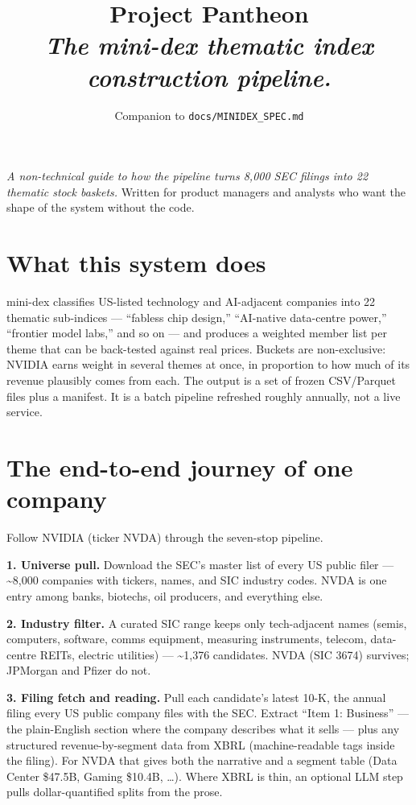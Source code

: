 \documentclass[11pt,a4paper,oneside]{article}
\title{\vspace{-1.2cm}\textbf{Project Pantheon}\\[0.35em]
       {\large\normalfont\itshape The mini-dex thematic index construction pipeline.}}
\date{\small Companion to \texttt{docs/MINIDEX\_SPEC.md}}
\author{}
\begin{document}
\maketitle
\vspace{-1.5em}

\noindent\emph{A non-technical guide to how the pipeline turns 8,000 SEC filings into 22 thematic stock baskets.} Written for product managers and analysts who want the shape of the system without the code.

\vspace{0.5em}

\tableofcontents

\vspace{1em}

\section{What this system does}

mini-dex classifies US-listed technology and AI-adjacent companies into 22 thematic sub-indices --- ``fabless chip design,'' ``AI-native data-centre power,'' ``frontier model labs,'' and so on --- and produces a weighted member list per theme that can be back-tested against real prices. Buckets are non-exclusive: NVIDIA earns weight in several themes at once, in proportion to how much of its revenue plausibly comes from each. The output is a set of frozen CSV/Parquet files plus a manifest. It is a batch pipeline refreshed roughly annually, not a live service.

\section{The end-to-end journey of one company}

Follow NVIDIA (ticker NVDA) through the seven-stop pipeline.

\textbf{1. Universe pull.} Download the SEC's master list of every US public filer --- \textasciitilde 8,000 companies with tickers, names, and SIC industry codes. NVDA is one entry among banks, biotechs, oil producers, and everything else.

\textbf{2. Industry filter.} A curated SIC range keeps only tech-adjacent names (semis, computers, software, comms equipment, measuring instruments, telecom, data-centre REITs, electric utilities) --- \textasciitilde 1,376 candidates. NVDA (SIC 3674) survives; JPMorgan and Pfizer do not.

\textbf{3. Filing fetch and reading.} Pull each candidate's latest 10-K, the annual filing every US public company files with the SEC. Extract ``Item 1: Business'' --- the plain-English section where the company describes what it sells --- plus any structured revenue-by-segment data from XBRL (machine-readable tags inside the filing). For NVDA that gives both the narrative and a segment table (Data Center \$47.5B, Gaming \$10.4B, \ldots). Where XBRL is thin, an optional LLM step pulls dollar-quantified splits from the prose.
\end{document}
